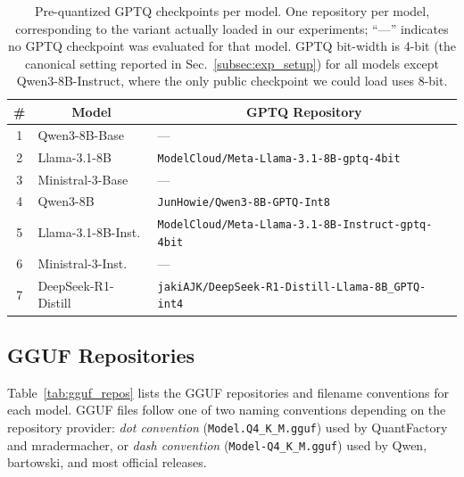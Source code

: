 \begin{table}[h]
\centering
\caption{Pre-quantized GPTQ checkpoints per model.
One repository per model, corresponding to the variant actually loaded in our experiments;
``---'' indicates no GPTQ checkpoint was evaluated for that model.
GPTQ bit-width is 4-bit (the canonical setting reported in Sec.~\ref{subsec:exp_setup}) for all models except Qwen3-8B-Instruct, where the only public checkpoint we could load uses 8-bit.}
\label{tab:gptq_awq}
\small
\setlength{\tabcolsep}{4pt}
\begin{tabular}{@{}cl p{8cm}@{}}
\toprule
\multicolumn{1}{c}{\textbf{\#}} & \multicolumn{1}{c}{\textbf{Model}} & \multicolumn{1}{c}{\textbf{GPTQ Repository}} \\
\midrule
1  & Qwen3-8B-Base       & --- \\
2  & Llama-3.1-8B        & \texttt{ModelCloud/Meta-Llama-3.1-8B-gptq-4bit} \\
3  & Ministral-3-Base    & --- \\
4  & Qwen3-8B            & \texttt{JunHowie/Qwen3-8B-GPTQ-Int8} \\
5  & Llama-3.1-8B-Inst.  & \texttt{ModelCloud/Meta-Llama-3.1-8B-Instruct-gptq-4bit} \\
6  & Ministral-3-Inst.   & --- \\
7  & DeepSeek-R1-Distill & \texttt{jakiAJK/DeepSeek-R1-Distill-Llama-8B\_GPTQ-int4} \\
\bottomrule
\end{tabular}
\end{table}


\subsection{GGUF Repositories}
\label{app:gguf_repos}

Table~\ref{tab:gguf_repos} lists the GGUF repositories and filename conventions for each model.
GGUF files follow one of two naming conventions depending on the repository provider:
\emph{dot convention} (\texttt{Model.Q4\_K\_M.gguf}) used by QuantFactory and mradermacher,
or \emph{dash convention} (\texttt{Model-Q4\_K\_M.gguf}) used by Qwen, bartowski, and most official releases.

